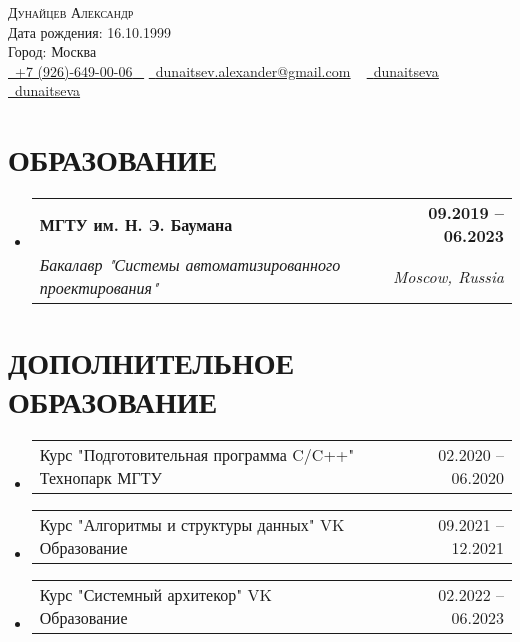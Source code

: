 \documentclass[letterpaper,11pt]{article}
\makeatletter
\newcommand{\resumeSubheading}[4]{
  \vspace{-2pt}\item
    \begin{tabular*}{1.0\textwidth}[t]{l@{\extracolsep{\fill}}r}
      \textbf{\large#1} & \textbf{\small #2} \\
      \textit{\large#3} & \textit{\small #4} \\
      
    \end{tabular*}\vspace{-7pt}
}
\newcommand{\resumeSubheadingAdditional}[2]{
	\vspace{-2pt}\item
	\begin{tabular*}{1.0\textwidth}[t]{l@{\extracolsep{\fill}}r}
		\large#1 & \small #2 \\
		
	\end{tabular*}\vspace{-7pt}
}
\newcommand{\resumeSubHeadingListStart}{\begin{itemize}[leftmargin=0.0in, label={}]}
\newcommand{\resumeSubHeadingListEnd}{\end{itemize}}
\makeatother
\begin{document}


\begin{center}
    {\Huge \scshape Дунайцев Александр} \\ \vspace{1pt}
    Дата рождения: 16.10.1999 \\  Город: Москва \\ \vspace{1pt}
    \small \href{tel:+79266490006}{ \raisebox{-0.1\height}\faPhone\ \underline{+7 (926)-649-00-06} ~} \href{dunaitsev.alexander@gmail.com}{\raisebox{-0.2\height}\faEnvelope\  \underline{dunaitsev.alexander@gmail.com}} ~ 
    \href{https://github.com/dunaitseva}{\raisebox{-0.2\height}\faGithub\ \underline{dunaitseva}} ~
    \href{https://t.me/dunaitseva}{\raisebox{-0.2\height}\faTelegram\ \underline{dunaitseva}} ~
    \vspace{-8pt}
\end{center}


\section{ОБРАЗОВАНИЕ}
  \resumeSubHeadingListStart
  \resumeSubheading
  {МГТУ им. Н. Э. Баумана}{09.2019 -- 06.2023}
  {Бакалавр "Системы автоматизированного проектирования"}{Moscow, Russia}
  \resumeSubHeadingListEnd

\section{ДОПОЛНИТЕЛЬНОЕ ОБРАЗОВАНИЕ}
\resumeSubHeadingListStart
\resumeSubheadingAdditional
{Курс "Подготовительная программа C/C++" Технопарк МГТУ}{02.2020 -- 06.2020}
\resumeSubHeadingListEnd

\resumeSubHeadingListStart
\resumeSubheadingAdditional
{Курс "Алгоритмы и структуры данных" VK Образование}{09.2021 -- 12.2021}
\resumeSubHeadingListEnd

\resumeSubHeadingListStart
\resumeSubheadingAdditional
{Курс "Системный архитекор" VK Образование}{02.2022 -- 06.2023}
\resumeSubHeadingListEnd
\end{document}

